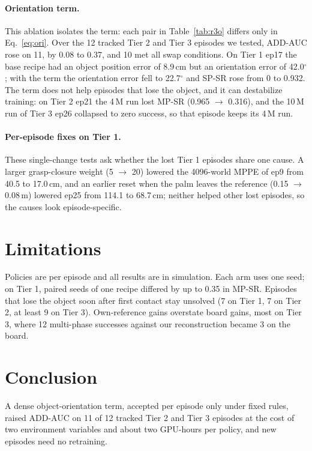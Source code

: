 \documentclass[10pt]{nvidiaextabstract}
\begin{document}
\paragraph{Orientation term.}
This ablation isolates the term: each pair in Table~\ref{tab:r3o} differs only in Eq.~\ref{eq:ori}.
Over the 12 tracked Tier 2 and Tier 3 episodes we tested, ADD-AUC rose on 11, by 0.08 to 0.37, and 10 met all swap conditions.
On Tier 1 ep17 the base recipe had an object position error of 8.9\,cm but an orientation error of 42.0$^\circ$; with the term the orientation error fell to 22.7$^\circ$ and SP-SR rose from 0 to 0.932.
The term does not help episodes that lose the object, and it can destabilize training: on Tier 2 ep21 the 4\,M run lost MP-SR (0.965 $\rightarrow$ 0.316), and the 10\,M run of Tier 3 ep26 collapsed to zero success, so that episode keeps its 4\,M run.

\paragraph{Per-episode fixes on Tier 1.}
These single-change tests ask whether the lost Tier 1 episodes share one cause.
A larger grasp-closure weight (5 $\rightarrow$ 20) lowered the 4096-world MPPE of ep9 from 40.5 to 17.0\,cm, and an earlier reset when the palm leaves the reference (0.15 $\rightarrow$ 0.08\,m) lowered ep25 from 114.1 to 68.7\,cm; neither helped other lost episodes, so the causes look episode-specific.

\section{Limitations}
\label{sec:limits}

Policies are per episode and all results are in simulation.
Each arm uses one seed; on Tier 1, paired seeds of one recipe differed by up to 0.35 in MP-SR.
Episodes that lose the object soon after first contact stay unsolved (7 on Tier 1, 7 on Tier 2, at least 9 on Tier 3).
Own-reference gains overstate board gains, most on Tier 3, where 12 multi-phase successes against our reconstruction became 3 on the board.

\balance

\section{Conclusion}
\label{sec:conclusion}

A dense object-orientation term, accepted per episode only under fixed rules, raised ADD-AUC on 11 of 12 tracked Tier 2 and Tier 3 episodes at the cost of two environment variables and about two GPU-hours per policy, and new episodes need no retraining.






\end{document}
